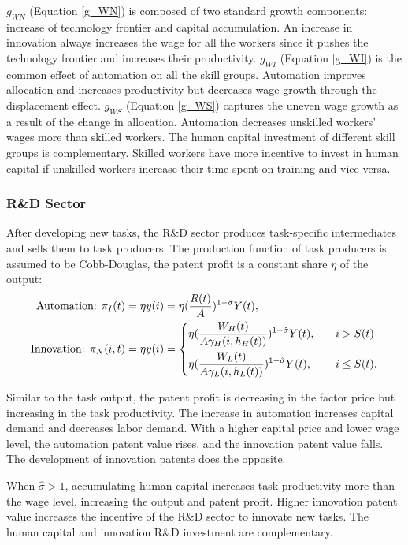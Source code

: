 \documentclass[12pt]{article}
\begin{document}
$g_{WN}$ (Equation \ref{g_WN}) is composed of two standard growth components: increase of technology frontier and capital accumulation. An increase in innovation always increases the wage for all the workers since it pushes the technology frontier and increases their productivity. $g_{WI}$ (Equation \ref{g_WI}) is the common effect of automation on all the skill groups. Automation improves allocation and increases productivity but decreases wage growth through the displacement effect. $g_{WS}$ (Equation \ref{g_WS}) captures the uneven wage growth as a result of the change in allocation. Automation decreases unskilled workers' wages more than skilled workers. The human capital investment of different skill groups is complementary. Skilled workers have more incentive to invest in human capital if unskilled workers increase their time spent on training and vice versa. 

\subsubsection*{R\&D Sector}
After developing new tasks, the R\&D sector produces task-specific intermediates and sells them to task producers. The production function of task producers is assumed to be Cobb-Douglas, the patent profit is a constant share $\eta$ of the output: 
\begin{align*}
\text{Automation: } \pi_I(t)& =\eta y(i) = \eta(\frac{R(t)}{A})^{1-\hat{\sigma}}Y(t), \\
\text{Innovation: } \pi_N(i,t)&= \eta y(i) = 
\begin{dcases}
\eta(\frac{W_H(t)}{A\gamma_H(i,h_H(t))})^{1-\hat{\sigma}}Y(t),  \quad & i>S(t)  \\
\eta(\frac{W_L(t)}{A\gamma_L(i,h_L(t))})^{1-\hat{\sigma}}Y(t),  \quad & i \leq S(t).
\end{dcases}
\end{align*}

Similar to the task output, the patent profit is decreasing in the factor price but increasing in the task productivity. The increase in automation increases capital demand and decreases labor demand. With a higher capital price and lower wage level, the automation patent value rises, and the innovation patent value falls. The development of innovation patents does the opposite. 

When $\hat{\sigma}>1$, accumulating human capital increases task productivity more than the wage level, increasing the output and patent profit. Higher innovation patent value increases the incentive of the R\&D sector to innovate new tasks. The human capital and innovation R\&D investment are complementary. 
\end{document}
